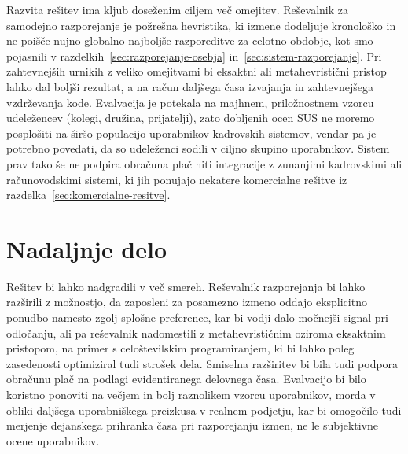 Razvita rešitev ima kljub doseženim ciljem več omejitev. Reševalnik za samodejno razporejanje je požrešna hevristika, ki izmene dodeljuje kronološko in ne poišče nujno globalno najboljše razporeditve za celotno obdobje, kot smo pojasnili v razdelkih~\ref{sec:razporejanje-osebja} in~\ref{sec:sistem-razporejanje}. Pri zahtevnejših urnikih z veliko omejitvami bi eksaktni ali metahevristični pristop lahko dal boljši rezultat, a na račun daljšega časa izvajanja in zahtevnejšega vzdrževanja kode. Evalvacija je potekala na majhnem, priložnostnem vzorcu udeležencev (kolegi, družina, prijatelji), zato dobljenih ocen SUS ne moremo posplošiti na širšo populacijo uporabnikov kadrovskih sistemov, vendar pa je potrebno povedati, da so udeleženci sodili v ciljno skupino uporabnikov. Sistem prav tako še ne podpira obračuna plač niti integracije z zunanjimi kadrovskimi ali računovodskimi sistemi, ki jih ponujajo nekatere komercialne rešitve iz razdelka~\ref{sec:komercialne-resitve}.

\section{Nadaljnje delo}

Rešitev bi lahko nadgradili v več smereh. Reševalnik razporejanja bi lahko razširili z možnostjo, da zaposleni za posamezno izmeno oddajo eksplicitno ponudbo namesto zgolj splošne preference, kar bi vodji dalo močnejši signal pri odločanju, ali pa reševalnik nadomestili z metahevrističnim oziroma eksaktnim pristopom, na primer s celoštevilskim programiranjem, ki bi lahko poleg zasedenosti optimiziral tudi strošek dela. Smiselna razširitev bi bila tudi podpora obračunu plač na podlagi evidentiranega delovnega časa. Evalvacijo bi bilo koristno ponoviti na večjem in bolj raznolikem vzorcu uporabnikov, morda v obliki daljšega uporabniškega preizkusa v realnem podjetju, kar bi omogočilo tudi merjenje dejanskega prihranka časa pri razporejanju izmen, ne le subjektivne ocene uporabnikov.
